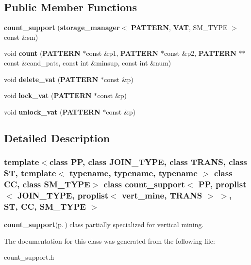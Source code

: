 \subsection*{Public Member Functions}
\begin{CompactItemize}
\item 
{\bf count\_\-support} ({\bf storage\_\-manager}$<$ {\bf PATTERN}, {\bf VAT}, SM\_\-TYPE $>$ const \&sm)\label{classcount__support_3_01PP_00_01proplist_3_01JOIN__TYPE_00_01proplist_3_01vert__mine_00_01TRANS_01_4_01_4_00_01ST_00_01CC_00_01SM__TYPE_01_4_a0}

\item 
void {\bf count} ({\bf PATTERN} $\ast$const \&p1, {\bf PATTERN} $\ast$const \&p2, {\bf PATTERN} $\ast$$\ast$const \&cand\_\-pats, const  int \&minsup, const  int \&num)\label{classcount__support_3_01PP_00_01proplist_3_01JOIN__TYPE_00_01proplist_3_01vert__mine_00_01TRANS_01_4_01_4_00_01ST_00_01CC_00_01SM__TYPE_01_4_a1}

\item 
void {\bf delete\_\-vat} ({\bf PATTERN} $\ast$const \&p)\label{classcount__support_3_01PP_00_01proplist_3_01JOIN__TYPE_00_01proplist_3_01vert__mine_00_01TRANS_01_4_01_4_00_01ST_00_01CC_00_01SM__TYPE_01_4_a2}

\item 
void {\bf lock\_\-vat} ({\bf PATTERN} $\ast$const \&p)\label{classcount__support_3_01PP_00_01proplist_3_01JOIN__TYPE_00_01proplist_3_01vert__mine_00_01TRANS_01_4_01_4_00_01ST_00_01CC_00_01SM__TYPE_01_4_a3}

\item 
void {\bf unlock\_\-vat} ({\bf PATTERN} $\ast$const \&p)\label{classcount__support_3_01PP_00_01proplist_3_01JOIN__TYPE_00_01proplist_3_01vert__mine_00_01TRANS_01_4_01_4_00_01ST_00_01CC_00_01SM__TYPE_01_4_a4}

\end{CompactItemize}


\subsection{Detailed Description}
\subsubsection*{template$<$class PP, class JOIN\_\-TYPE, class TRANS, class ST, template$<$ typename, typename, typename $>$ class CC, class SM\_\-TYPE$>$ class count\_\-support$<$ PP, proplist$<$ JOIN\_\-TYPE, proplist$<$ vert\_\-mine, TRANS $>$ $>$, ST, CC, SM\_\-TYPE $>$}

{\bf count\_\-support}{\rm (p.\,\pageref{classcount__support})} class partially specialized for vertical mining. 



The documentation for this class was generated from the following file:\begin{CompactItemize}
\item 
count\_\-support.h\end{CompactItemize}
